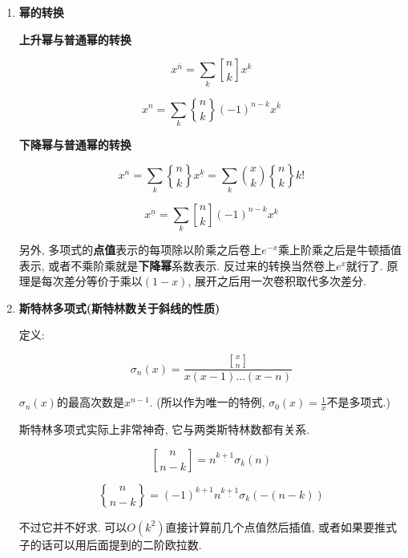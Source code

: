\begin{enumerate}
    \item \textbf{幂的转换}
    
    \textbf{上升幂与普通幂的转换}
    
    $$ x^{\overline{n}}=\sum_{k} {n \brack k} x^k $$
    
    $$ x^n=\sum_{k} {n \brace k} (-1)^{n-k} x^{\overline{k}} $$
    
    \textbf{下降幂与普通幂的转换}
    
    $$ x^n=\sum_{k} {n \brace k} x^{\underline{k}} = \sum_{k} {x \choose k} {n \brace k} k! $$
    
    $$ x^{\underline{n}}=\sum_{k} {n \brack k} (-1)^{n-k} x^k $$
    
    另外, 多项式的\textbf{点值}表示的每项除以阶乘之后卷上$e^{-x}$乘上阶乘之后是牛顿插值表示, 或者不乘阶乘就是\textbf{下降幂}系数表示. 反过来的转换当然卷上$e^x$就行了. 原理是每次差分等价于乘以$(1 - x)$, 展开之后用一次卷积取代多次差分.
    
    \item \textbf{斯特林多项式(斯特林数关于斜线的性质)}
    
    定义:
    
    $$ \sigma_n(x) = \frac {{x\brack n}} {x(x-1)\dots(x-n)} $$
    
    $\sigma_n(x)$的最高次数是$x^{n - 1}$. (所以作为唯一的特例, $\sigma_0(x) = \frac 1 x$不是多项式.)
    
    斯特林多项式实际上非常神奇, 它与两类斯特林数都有关系.
    
    $$ {n \brack n-k} = n^{\underline{k+1}} \sigma_k(n) $$
    
    $$ {n \brace n-k} = (-1)^{k+1} n^{\underline{k+1}} \sigma_k(-(n-k)) $$
    
    不过它并不好求. 可以$O(k^2)$直接计算前几个点值然后插值, 或者如果要推式子的话可以用后面提到的二阶欧拉数.
    
    \end{enumerate}